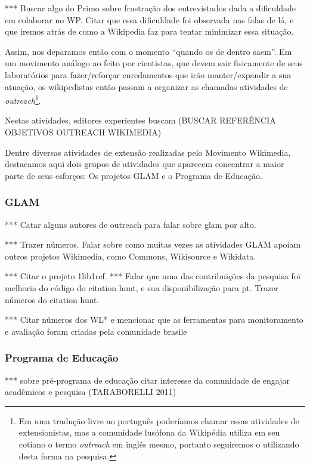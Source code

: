 *** Buscar algo do Primo sobre frustração dos entrevistados dada a dificuldade em colaborar no WP. Citar que essa dificuldade foi observada nas falas de lá, e que iremos atrás de como a Wikipedia faz para tentar minimizar essa situação.

Assim, nos deparamos então com o momento ``quando os de dentro saem''. Em um movimento análogo ao feito por cientistas, que devem sair fisicamente de seus laboratórios para fazer/reforçar enredamentos que irão manter/expandir a sua atuação, os wikipedistas então passam a organizar as chamadas atividades de \textit{outreach}\footnote{Em uma tradução livre ao português poderíamos chamar essas atividades de extensionistas, mas a comunidade lusófona da Wikipédia utiliza em seu cotiano o termo \textit{outreach} em inglês mesmo, portanto seguiremos o utilizando desta forma na pesquisa.}. 

Nestas atividades, editores experientes buscam (BUSCAR REFERÊNCIA OBJETIVOS OUTREACH WIKIMEDIA)

Dentre diversas atividades de extensão realizadas pelo Movimento Wikimedia, destacamos aqui dois grupos de atividades que aparecem concentrar a maior parte de seus esforços: Os projetos GLAM e o Programa de Educação.

\subsubsection{GLAM}

*** Catar alguns autores de outreach para falar sobre glam por alto.

*** Trazer números. Falar sobre como muitas vezes as atividades GLAM apoiam outros projetos Wikimedia, como Commons, Wikisource e Wikidata.

***  Citar o projeto 1lib1ref.
***  Falar que uma das contribuições da pesquisa foi melhoria do código do citation hunt, e sua disponibilização para pt. Trazer números do citation hunt.

*** Citar números dos WL* e mencionar que as ferramentas para monitoramento e avaliação foram criadas pela comunidade brasile

\subsubsection{Programa de Educação}

*** sobre pré-programa de educação citar interesse da comunidade de engajar acadêmicos e pesquisa (TARABORELLI 2011)

